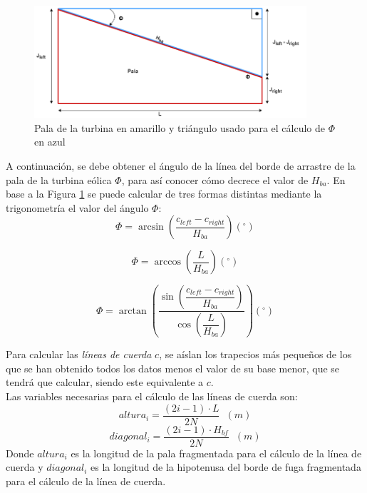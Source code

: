 \begin{figure}[H]
    \centering
    \includegraphics[width=0.9\textwidth]{images/triangulo sacar phi.png}
    \caption{Pala de la turbina en amarillo y triángulo usado para el cálculo de $\Phi$ en azul}
    
    \label{fig:pala_calculo_phi}
\end{figure}

A continuación, se debe obtener el ángulo de la línea del borde de arrastre de la pala de la turbina eólica $\Phi$, para así conocer cómo decrece el valor de $H_{ba}$.
En base a la Figura \ref{fig:pala_calculo_phi} se puede calcular de tres formas distintas mediante la trigonometría el valor del ángulo $\Phi$:
\begin{equation}
 \Phi = \arcsin{\left(\dfrac{c_{left} - c_{right}}{H_{ba}}\right)} (^{\circ})
\label{def_angulo_phi_1}
\end{equation}

\begin{equation}
 \Phi = \arccos{\left(\dfrac{L}{H_{ba}}\right)} (^{\circ})
\label{def_angulo_phi_2}
\end{equation}

\begin{equation}
 \Phi = \arctan{\left(\dfrac{\sin{\left(\dfrac{c_{left} - c_{right}}{H_{ba}}\right)}}{\cos{\left(\dfrac{L}{H_{ba}}\right)}}\right)} (^{\circ}) 
\label{def_angulo_phi_3}
\end{equation}


Para calcular las \textit{líneas de cuerda} $c$, se aíslan los trapecios más pequeños de los que se han obtenido todos los datos menos el valor de su base menor, que se tendrá que calcular, siendo este equivalente a $c$.\\

Las variables necesarias para el cálculo de las líneas de cuerda son:
\begin{equation}
 altura_i = \dfrac{(2i - 1) \cdot L}{2N} \hspace{7pt} (m)
\label{def_variables_fragmentadas1}
\end{equation}
\begin{equation}
     diagonal_i = \dfrac{(2i - 1) \cdot H_{bf}}{2N} \hspace{7pt} (m)
\label{def_variables_fragmentadas2}
\end{equation}
Donde $altura_i$ es la longitud de la pala fragmentada para el cálculo de la línea de cuerda y $diagonal_i$ es la longitud de la hipotenusa del borde de fuga fragmentada para el cálculo de la línea de cuerda.\\

